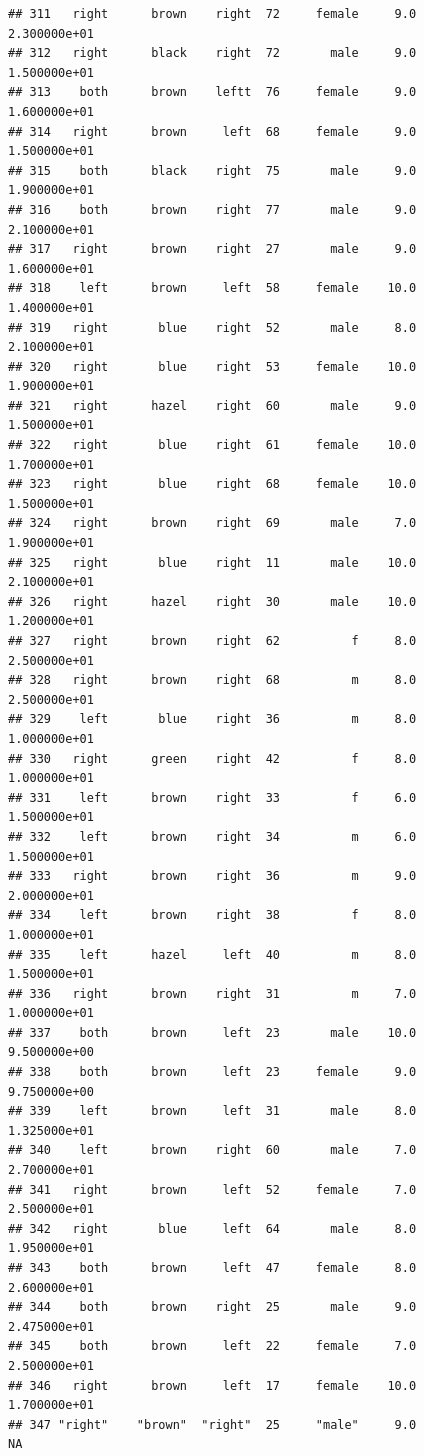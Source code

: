 \documentclass[]{article}
\begin{document}
\begin{verbatim}
## 311   right      brown    right  72     female     9.0  2.300000e+01
## 312   right      black    right  72       male     9.0  1.500000e+01
## 313    both      brown    leftt  76     female     9.0  1.600000e+01
## 314   right      brown     left  68     female     9.0  1.500000e+01
## 315    both      black    right  75       male     9.0  1.900000e+01
## 316    both      brown    right  77       male     9.0  2.100000e+01
## 317   right      brown    right  27       male     9.0  1.600000e+01
## 318    left      brown     left  58     female    10.0  1.400000e+01
## 319   right       blue    right  52       male     8.0  2.100000e+01
## 320   right       blue    right  53     female    10.0  1.900000e+01
## 321   right      hazel    right  60       male     9.0  1.500000e+01
## 322   right       blue    right  61     female    10.0  1.700000e+01
## 323   right       blue    right  68     female    10.0  1.500000e+01
## 324   right      brown    right  69       male     7.0  1.900000e+01
## 325   right       blue    right  11       male    10.0  2.100000e+01
## 326   right      hazel    right  30       male    10.0  1.200000e+01
## 327   right      brown    right  62          f     8.0  2.500000e+01
## 328   right      brown    right  68          m     8.0  2.500000e+01
## 329    left       blue    right  36          m     8.0  1.000000e+01
## 330   right      green    right  42          f     8.0  1.000000e+01
## 331    left      brown    right  33          f     6.0  1.500000e+01
## 332    left      brown    right  34          m     6.0  1.500000e+01
## 333   right      brown    right  36          m     9.0  2.000000e+01
## 334    left      brown    right  38          f     8.0  1.000000e+01
## 335    left      hazel     left  40          m     8.0  1.500000e+01
## 336   right      brown    right  31          m     7.0  1.000000e+01
## 337    both      brown     left  23       male    10.0  9.500000e+00
## 338    both      brown     left  23     female     9.0  9.750000e+00
## 339    left      brown     left  31       male     8.0  1.325000e+01
## 340    left      brown    right  60       male     7.0  2.700000e+01
## 341   right      brown     left  52     female     7.0  2.500000e+01
## 342   right       blue     left  64       male     8.0  1.950000e+01
## 343    both      brown     left  47     female     8.0  2.600000e+01
## 344    both      brown    right  25       male     9.0  2.475000e+01
## 345    both      brown     left  22     female     7.0  2.500000e+01
## 346   right      brown     left  17     female    10.0  1.700000e+01
## 347 "right"    "brown"  "right"  25     "male"     9.0            NA

\end{verbatim}
\end{document}
